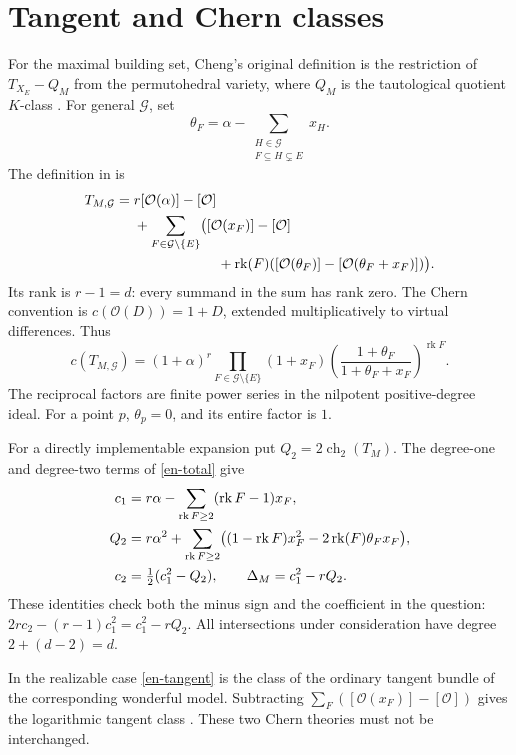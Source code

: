 \documentclass[12pt]{amsart}
\theoremstyle{definition}
\theoremstyle{remark}
\numberwithin{equation}{section}
\newcommand{\rk}{\operatorname{rk}}
\DeclareMathOperator{\ch}{ch}
\begin{document}
\section{Tangent and Chern classes}
For the maximal building set, Cheng's original definition is the restriction of $T_{X_E}-Q_M$ from the permutohedral variety, where $Q_M$ is the tautological quotient $K$-class \cite[Definition 3.1]{Che}. For general $\mathcal G$, set
\[
 \theta_F=\alpha-\sum_{\substack{H\in\mathcal G\\F\subseteq H\subsetneq E}}x_H.
\]
The definition in \cite[Definition 3.3]{CheG} is
\begin{align}\label{en-tangent}
 T_{M,\mathcal G}={}&r[\mathcal O(\alpha)]-[\mathcal O]\notag\\
 &+\sum_{F\in\mathcal G\setminus\{E\}}\bigl([\mathcal O(x_F)]-[\mathcal O]\notag\\
 &\hspace{21mm}+\rk(F)([\mathcal O(\theta_F)]-[\mathcal O(\theta_F+x_F)])\bigr).
\end{align}
Its rank is $r-1=d$: every summand in the sum has rank zero. The Chern convention is $c(\mathcal O(D))=1+D$, extended multiplicatively to virtual differences. Thus
\begin{equation}\label{en-total}
 c(T_{M,\mathcal G})=(1+\alpha)^r
 \prod_{F\in\mathcal G\setminus\{E\}}(1+x_F)
 \left(\frac{1+\theta_F}{1+\theta_F+x_F}\right)^{\rk F}.
\end{equation}
The reciprocal factors are finite power series in the nilpotent positive-degree ideal. For a point $p$, $\theta_p=0$, and its entire factor is $1$.

For a directly implementable expansion put $Q_2=2\ch_2(T_M)$. The degree-one and degree-two terms of \eqref{en-total} give
\begin{align}\label{en-c12}
 c_1&=r\alpha-\sum_{\rk F\geq2}(\rk F-1)x_F,\notag\\
 Q_2&=r\alpha^2+\sum_{\rk F\geq2}
       \bigl((1-\rk F)x_F^2-2\rk(F)\theta_Fx_F\bigr),\\
 c_2&=\tfrac12(c_1^2-Q_2),\qquad
 \Delta_M=c_1^2-rQ_2.\notag
\end{align}
These identities check both the minus sign and the coefficient in the question: $2r c_2-(r-1)c_1^2=c_1^2-rQ_2$. All intersections under consideration have degree $2+(d-2)=d$.

In the realizable case \eqref{en-tangent} is the class of the ordinary tangent bundle of the corresponding wonderful model. Subtracting $\sum_F([\mathcal O(x_F)]-[\mathcal O])$ gives the logarithmic tangent class \cite[Section 3.2]{CheG}. These two Chern theories must not be interchanged.
\end{document}
